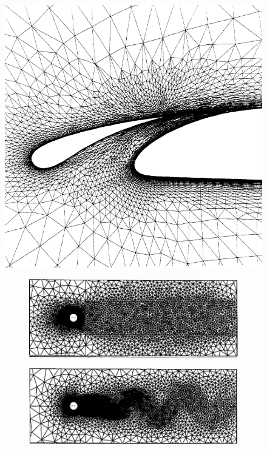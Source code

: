 \begin{figure}
\centering
\begin{minipage}[b]{.4\textwidth}
	\centering
	\includegraphics[width=\linewidth]{img/intro/lit/mavri.png}
	\caption{Adaptively refined mesh for a two-element airfoil configuration near the gap region \cite{mavriplis1990adaptive}.}
	\label{fig-mavri}
\end{minipage}\hfill
\begin{minipage}[b]{.55\textwidth}
	\centering
	\begin{subfigure}{\linewidth}
	\centering
	\includegraphics[width=\linewidth]{img/intro/lit/castroInitial.png}
	\caption{}
	\label{fig-castroInitial}
	\end{subfigure}
	\begin{subfigure}{\linewidth}
		\centering
		\includegraphics[width=\linewidth]{img/intro/lit/castro.png}

\end{subfigure}
\end{minipage}
\end{figure}

